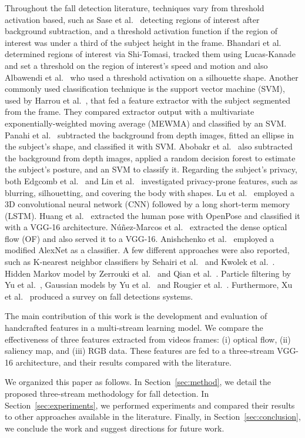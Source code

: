 \documentclass[conference]{IEEEtran}
\begin{document}
Throughout the fall detection literature, techniques vary from threshold activation based, such as Sase et al.~\cite{sase2018human} detecting regions of interest after background subtraction, and a threshold activation function if the region of interest was under a third of the subject height in the frame. Bhandari et al.~\cite{bhandari2017novel} determined regions of interest via Shi-Tomasi, tracked them using Lucas-Kanade and set a threshold on the region of interest's speed and motion and also Albawendi et al.~\cite{albawendi2018video} who used a threshold activation on a silhouette shape. Another commonly used classification technique is the support vector machine (SVM), used by Harrou et al.~\cite{harrou2017vision}, that fed a feature extractor with the subject segmented from the frame. They compared extractor output with a multivariate exponentially-weighted moving average (MEWMA) and classified by an SVM. Panahi et al.~\cite{panahi2018human} subtracted the background from depth images, fitted an ellipse in the subject's shape, and classified it with SVM. Abobakr et al.~\cite{abobakr2017skeleton} also subtracted the background from depth images, applied a random decision forest to estimate the subject's posture, and an SVM to classify it. Regarding the subject's privacy, both Edgcomb et al.~\cite{edgcomb2012automated} and Lin et al.~\cite{lin2013fall} investigated privacy-prone features, such as blurring, silhouetting, and covering the body with shapes. Lu et al.~\cite{lu2018deep} employed a 3D convolutional neural network (CNN) followed by a long short-term memory (LSTM). Huang et al.~\cite{huang2018video} extracted the human pose with OpenPose and classified it with a VGG-16 architecture. Núñez-Marcos et al.~\cite{nunez2017vision} extracted the dense optical flow (OF) and also served it to a VGG-16. Anishchenko et al.~\cite{anishchenko2018machine} employed a modified AlexNet as a classifier. A few different approaches were also reported, such as K-nearest neighbor classifiers by Sehairi et al.~\cite{sehairi2018elderly} and Kwolek et al.~\cite{kwolek2015improving}. Hidden Markov model by Zerrouki et al.~\cite{zerrouki2018combined} and Qian et al.~\cite{qian2017recognizing}. Particle filtering by Yu et al.~\cite{yu2009fall}, Gaussian models by Yu et al.~\cite{yu2010robust} and Rougier et al.~\cite{rougier2011robust}. Furthermore, Xu et al.~\cite{xu2018new} produced a survey on fall detections systems.\par
The main contribution of this work is the development and evaluation of handcrafted features in a multi-stream learning model. We compare the effectiveness of three features extracted from videos frames: (i) optical flow, (ii) saliency map, and (iii) RGB data. These features are fed to a three-stream VGG-16 architecture, and their results compared with the literature.\par
We organized this paper as follows. In Section~\ref{sec:method}, we detail the proposed three-stream methodology for fall detection. In Section~\ref{sec:experiments}, we performed experiments and compared their results to other approaches available in the literature. Finally, in Section~\ref{sec:conclusion}, we conclude the work and suggest directions for future work.
\end{document}
